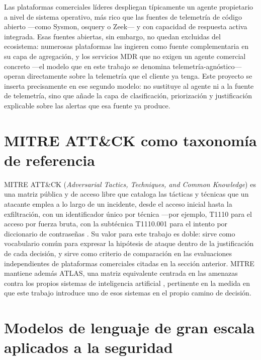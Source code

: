 Las plataformas comerciales líderes despliegan típicamente un agente propietario a nivel de
sistema operativo, más rico que las fuentes de telemetría de código abierto ---como Sysmon, osquery o
Zeek--- y con capacidad de respuesta activa integrada. Esas fuentes abiertas, sin embargo, no quedan
excluidas del ecosistema: numerosas plataformas las ingieren como fuente complementaria en su capa
de agregación, y los servicios MDR que no exigen un agente comercial concreto ---el modelo que en
este trabajo se denomina telemetría-agnóstico--- operan directamente sobre la telemetría que el
cliente ya tenga. Este proyecto se inserta precisamente en ese segundo modelo: no sustituye al
agente ni a la fuente de telemetría, sino que añade la capa de clasificación, priorización y
justificación explicable sobre las alertas que esa fuente ya produce.

\section{MITRE ATT\&CK como taxonomía de referencia}

MITRE ATT\&CK (\emph{Adversarial Tactics, Techniques, and Common Knowledge}) es una matriz pública
y de acceso libre que cataloga las tácticas y técnicas que un atacante emplea a lo largo de un
incidente, desde el acceso inicial hasta la exfiltración, con un identificador único por técnica
---por ejemplo, T1110 para el acceso por fuerza bruta, con la subtécnica T1110.001 para el intento
por diccionario de contraseñas \cite{mitreattack}. Su valor para este trabajo es doble: sirve como
vocabulario común para expresar la hipótesis de ataque dentro de la justificación de cada decisión,
y sirve como criterio de comparación en las evaluaciones independientes de plataformas comerciales
citadas en la sección anterior. MITRE mantiene además ATLAS, una matriz equivalente centrada en las
amenazas contra los propios sistemas de inteligencia artificial \cite{mitreatlas}, pertinente en la
medida en que este trabajo introduce uno de esos sistemas en el propio camino de decisión.

\section{Modelos de lenguaje de gran escala aplicados a la seguridad}

